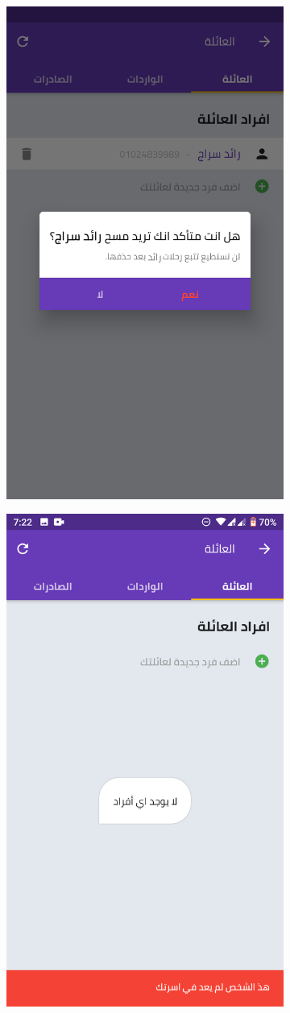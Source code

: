 \begin{figure}[H] 
 \begin{subfigure}[b]{0.5\linewidth}
    \centering
    \includegraphics[width=0.5\linewidth]{images/ch3/family/8.png}
  
  \end{subfigure}%
    \begin{subfigure}[b]{0.5\linewidth}
    \centering
    \includegraphics[width=0.5\linewidth]{images/ch3/family/9.png}
  

\end{subfigure}
\end{figure}
